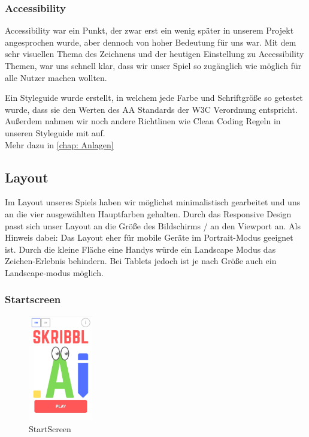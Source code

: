 \documentclass[11pt]{article}
\begin{document}
\subsubsection{Accessibility}

Accessibility war ein Punkt, der zwar erst ein wenig später in unserem Projekt angesprochen wurde, aber dennoch von hoher Bedeutung für uns war. Mit dem sehr visuellen Thema des Zeichnens und der heutigen Einstellung zu Accessibility Themen, war uns schnell klar, dass wir unser Spiel so zugänglich wie möglich für alle Nutzer machen wollten.

Ein Styleguide wurde erstellt, in welchem jede Farbe und Schriftgröße so getestet wurde, dass sie den Werten des AA Standards der W3C Verordnung entspricht. Außerdem nahmen wir noch andere Richtlinen wie Clean Coding Regeln in unseren Styleguide mit auf.\\
Mehr dazu in \autoref{chap: Anlagen} 

\subsection{Layout}
Im Layout unseres Spiels haben wir möglichst minimalistisch gearbeitet und uns an die vier ausgewählten Hauptfarben gehalten. Durch das Responsive Design passt sich unser Layout an die Größe des Bildschirms / an den Viewport an. Als Hinweis dabei: Das Layout eher für mobile Geräte im Portrait-Modus geeignet ist. Durch die kleine Fläche eine Handys würde ein Landscape Modus das Zeichen-Erlebnis behindern. Bei Tablets jedoch ist je nach Größe auch ein Landscape-modus möglich.

\subsubsection{Startscreen}

\begin{figure}
\centering
\includegraphics[width=0.25\textwidth]{images/Startscreen.jpg}
\caption{\label{fig:Startscreen}StartScreen}
\end{figure}
\end{document}
